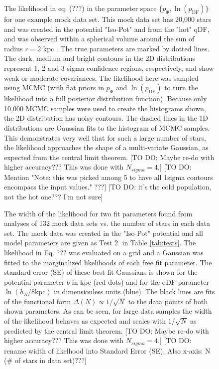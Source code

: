 \begin{figure}
\caption{The likelihood in eq. (???) in the parameter space $\{p_\Phi,\ln(p_\text{DF})\}$ for one example mock data set. This mock data set has 20,000 stars and was created in the potential "Iso-Pot" and from the "hot" qDF, and was observed within a spherical volume around the sun of radius $r = 2 \text{ kpc }$.  The true parameters are marked by dotted lines. The dark, medium and bright contours in the 2D distributions represent 1, 2 and 3 sigma confidence regions, respectively, and show weak or moderate covariances. The likelihood here was sampled using MCMC (with flat priors in $p_\Phi$ and  $\ln(p_\text{DF})$ to turn the likelihood into a full posterior distribution function). Because only 10,000 MCMC samples were used to create the histograms shown, the 2D distribution has noisy contours. The dashed lines in the 1D distributions are Gaussian fits to the histogram of MCMC samples. This demonstrates very well that for such a large number of stars, the likelihood approaches the shape of a multi-variate Gaussian, as expected from the central limit theorem. [TO DO: Maybe re-do with higher accuracy??? This was done with $N_{sigma} = 4$.] [TO DO: Mention "Note: this was picked among 5 to have all 1sigma contours encompass the input values." ???] [TO DO: it's the cold population, not the hot one??? I'm not sure]}
\label{fig:triangleplot}
\end{figure}



\begin{figure}
\caption{The width of the likelihood for two fit parameters found from analyses of 132 mock data sets vs. the number of stars in each data set. The mock data was created in the "Iso-Pot" potential and all model parameters are given as Test \textcircled{2} in Table \ref{tab:tests}. The likelihood in Eq. ???  was evaluated on a grid and a Gaussian was fitted to the marginalized likelihoods of each free fit parameter. The standard error (SE) of these best fit Gaussians is shown for the potential parameter $b$ in kpc (red dots) and for the qDF parameter $\ln(h_R/8\text{kpc})$ in dimensionless units (blue). The black lines are fits of the functional form $\Delta(N) \propto 1/\sqrt{N}$ to the data points  of both shown parameters. As can be seen, for large data samples the width of the likelihood behaves as expected and scales with $1/\sqrt{N}$ as predicted by the central limit theorem.  [TO DO: Maybe re-do with higher accuracy??? This was done with $N_{sigma} = 4$.] [TO DO: rename width of likelhood into Standard Error (SE). Also x-axis: N (\# of stars in data set)???]} 
\label{fig:sqrtN}
\end{figure}

